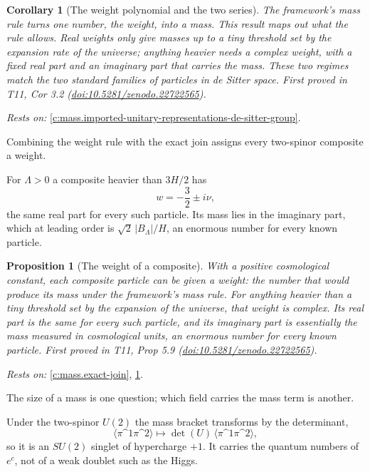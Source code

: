 \documentclass[11pt]{article}
\newtheorem{proposition}[theorem]{Proposition}
\newtheorem{corollary}[theorem]{Corollary}
\theoremstyle{definition}
\theoremstyle{plain}
\providecommand{\br}{}\renewcommand{\br}[1]{\langle #1\rangle}
\begin{document}
\begin{corollary}[The weight polynomial and the two series]\label{c:mass.weight-polynomial-two-series}
The framework's mass rule turns one number, the weight, into a mass. This result maps out what the rule allows. Real weights only give masses up to a tiny threshold set by the expansion rate of the universe; anything heavier needs a complex weight, with a fixed real part and an imaginary part that carries the mass. These two regimes match the two standard families of particles in de Sitter space.
\emph{First proved in} T11, Cor 3.2 (\href{https://doi.org/10.5281/zenodo.22722565}{doi:10.5281/zenodo.22722565}).
\end{corollary}
\noindent\emph{Rests on:} \ref{c:mass.imported-unitary-representations-de-sitter-group}.

Combining the weight rule with the exact join assigns every two-spinor composite a weight.

For $\Lambda > 0$ a composite heavier than $3H/2$ has \[ w = -\frac32 \pm i\nu, \] the same real part for every such particle. Its mass lies in the imaginary part, which at leading order is $\sqrt{2}\,|B_{\Lambda}|/H$, an enormous number for every known particle.

\begin{proposition}[The weight of a composite]\label{c:mass.weight-composite}
With a positive cosmological constant, each composite particle can be given a weight: the number that would produce its mass under the framework's mass rule. For anything heavier than a tiny threshold set by the expansion of the universe, that weight is complex. Its real part is the same for every such particle, and its imaginary part is essentially the mass measured in cosmological units, an enormous number for every known particle.
\emph{First proved in} T11, Prop 5.9 (\href{https://doi.org/10.5281/zenodo.22722565}{doi:10.5281/zenodo.22722565}).
\end{proposition}
\noindent\emph{Rests on:} \ref{c:mass.exact-join}, \ref{c:mass.weight-polynomial-two-series}.

The size of a mass is one question; which field carries the mass term is another.

Under the two-spinor $U(2)$ the mass bracket transforms by the determinant, \[ \br{\pi\^{}{1}\pi\^{}{2}} \mapsto \det(U)\,\br{\pi\^{}{1}\pi\^{}{2}}, \] so it is an $SU(2)$ singlet of hypercharge $+1$. It carries the quantum numbers of $e^{c}$, not of a weak doublet such as the Higgs.
\end{document}
